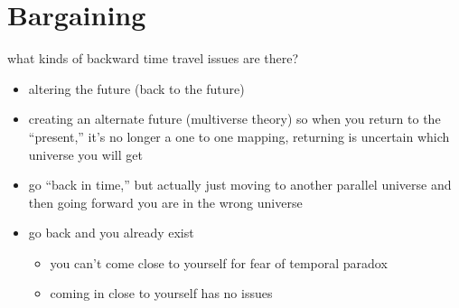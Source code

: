 \chapter*{Bargaining}

what kinds of backward time travel issues are there?


\begin{itemize}
    \item altering the future (back to the future)
    \item creating an alternate future (multiverse theory) so when you return to the ``present,'' it's no longer a one to one mapping, returning is uncertain which universe you will get
    \item go ``back in time,'' but actually just moving to another parallel universe and then going forward you are in the wrong universe
    \item go back and you already exist
    \begin{itemize}
        \item you can't come close to yourself for fear of temporal paradox
        \item coming in close to yourself has no issues
    \end{itemize}
\end{itemize}
